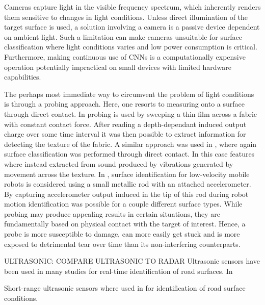 Cameras capture light in the visible frequency spectrum, which inherently renders them sensitive to changes in light conditions. Unless direct illumination of the target surface is used, a solution involving a camera is a passive device dependent on ambient light. Such a limitation can make cameras unsuitable for surface classification where light conditions varies and low power consumption is critical. Furthermore, making continuous use of CNNs is a computationally expensive operation potentially impractical on small devices with limited hardware capabilities. 

The perhaps most immediate way to circumvent the problem of light conditions is through a probing approach. Here, one resorts to measuring onto a surface through direct contact. In \citep{song_han_hu_li_2014} probing is used by sweeping a thin film across a fabric with constant contact force. After reading a depth-dependant induced output charge over some time interval it was then possible to extract information for detecting the texture of the fabric. A similar approach was used in \citep{strese_schuwerk_iepure_steinbach_2017}, where again surface classification was performed through direct contact. In this case features where instead extracted from sound produced by vibrations generated by movement across the texture. In \citep{giguere_dudek_2011}, surface identification for low-velocity mobile robots is considered using a small metallic rod with an attached accelerometer. By capturing accelerometer output induced in the tip of this rod during robot motion identification was possible for a couple different surface types. While probing may produce appealing results in certain situations, they are fundamentally based on physical contact with the target of interest. Hence, a probe is more susceptible to damage, can more easily get stuck and is more exposed to detrimental tear over time than its non-interfering counterparts. 

ULTRASONIC: COMPARE ULTRASONIC TO RADAR	
Ultrasonic sensors have been used in many studies for real-time identification of road surfaces. 
In 

Short-range ultrasonic sensors where used in \citep{bystrov_2016} for identification of road surface conditions. \citep{mckerrow_kristiansen_2006} 

